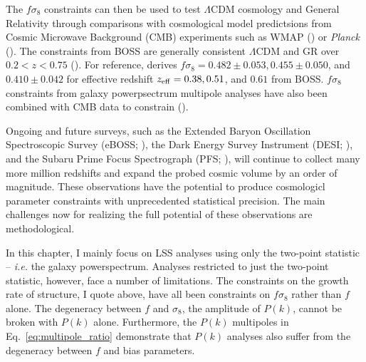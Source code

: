 The $f \sigma_8$ constraints can then be used to test $\Lambda$CDM cosmology and 
General Relativity through comparisons with cosmological model predictsions from 
Cosmic Microwave Background (CMB) experiments such as WMAP () or {\em Planck} ().
The constraints from BOSS are generally consistent $\Lambda$CDM and GR over 
$0.2 < z < 0.75$ ().  For reference,  derives 
$f\sigma_8 = 0.482 \pm 0.053, 0.455 \pm 0.050$, and $0.410 \pm 0.042$ for effective redshift 
$z_{\rm eff} = 0.38, 0.51$, and $0.61$ from BOSS. $f \sigma_8$ constraints from 
galaxy powerpsectrum multipole analyses have also been combined with CMB data to 
constrain \mneut ().

Ongoing and future surveys, such as the Extended Baryon Oscillation Spectroscopic 
Survey (eBOSS; ), the Dark Energy Survey Instrument 
(DESI; ), 
and the Subaru Prime Focus Spectrograph (PFS; ), will 
continue to collect many more million redshifts and expand the probed cosmic 
volume by an order of magnitude. These observations have the potential to 
produce cosmologicl parameter constraints with unprecedented statistical 
precision. The main challenges now for realizing the full potential of 
these observations are methodological.


In this chapter, I mainly focus on LSS analyses using only the two-point
statistic -- \emph{i.e.} the galaxy powerspectrum. Analyses restricted
to just the two-point statistic, however, face a number of limitations. 
The constraints on the growth rate of structure, I quote above, have all 
been constraints on $f \sigma_8$ rather than $f$ alone. The degeneracy 
between $f$ and $\sigma_8$, the amplitude of $P(k)$, cannot be broken 
with $P(k)$ alone. Furthermore, the $P(k)$ multipoles in 
Eq.~\ref{eq:multipole_ratio} demonstrate that $P(k)$ analyses also 
suffer from the degeneracy between $f$ and bias parameters. 

